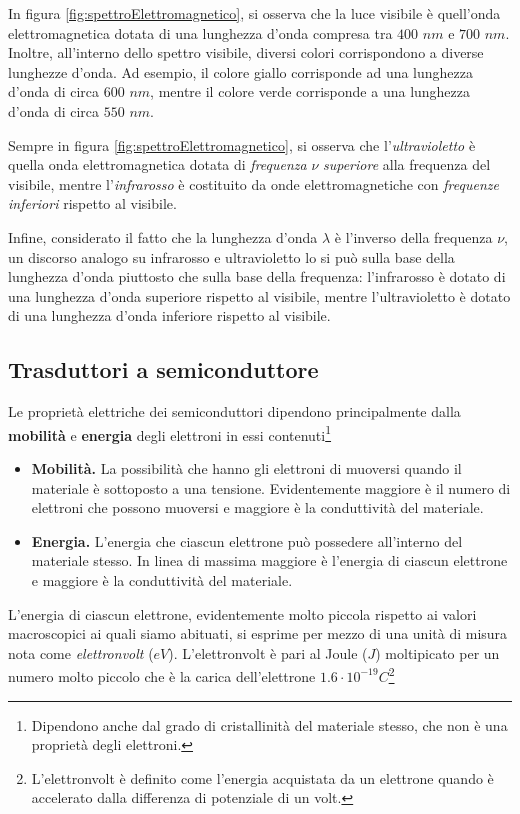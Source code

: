 \documentclass[17pt]{extarticle}
\begin{document}
In figura \ref{fig:spettroElettromagnetico}, si osserva che la luce visibile è quell'onda elettromagnetica dotata di una lunghezza d'onda compresa tra $400$ $nm$ e $700$ $nm$. Inoltre, all'interno dello spettro visibile, diversi colori corrispondono a diverse lunghezze d'onda. Ad esempio, il colore giallo corrisponde ad una lunghezza d'onda di circa $600$ $nm$, mentre il colore verde corrisponde a una lunghezza d'onda di circa $550$ $nm$. 

Sempre in figura \ref{fig:spettroElettromagnetico}, si osserva che l'\emph{ultravioletto} è quella onda elettromagnetica dotata di \emph{frequenza} $\nu$ \emph{superiore} alla frequenza del visibile, mentre l'\emph{infrarosso} è costituito da onde elettromagnetiche con \emph{frequenze} \emph{inferiori} rispetto al visibile. 

Infine, considerato il fatto che la lunghezza d'onda $\lambda$ è l'inverso della frequenza $\nu$, un discorso analogo su infrarosso e ultravioletto lo si può sulla base della lunghezza d'onda piuttosto che sulla base della frequenza: l'infrarosso è dotato di una lunghezza d'onda superiore rispetto al visibile, mentre l'ultravioletto è dotato di una lunghezza d'onda inferiore rispetto al visibile.


\subsection{Trasduttori a semiconduttore}\label{par:trasdSemicon}

Le proprietà elettriche dei semiconduttori dipendono principalmente dalla {\bf mobilità} e {\bf energia} degli elettroni in essi contenuti\footnote{Dipendono anche dal grado di cristallinità del materiale stesso, che non è una proprietà degli elettroni.}

\begin{itemize}
	\item {\bf Mobilità.} La possibilità che hanno gli elettroni di muoversi quando il materiale è sottoposto a una tensione. Evidentemente maggiore è il numero di elettroni che possono muoversi e maggiore è la conduttività del materiale.
	\item {\bf Energia.} L'energia che ciascun elettrone può possedere all'interno del materiale stesso. In linea di massima maggiore è l'energia di ciascun elettrone e maggiore è la conduttività del materiale. 	
\end{itemize}


	L'energia di ciascun elettrone, evidentemente molto piccola rispetto ai valori macroscopici ai quali siamo abituati, si esprime per mezzo di una unità di misura nota come \emph{elettronvolt} ($eV$). L'elettronvolt è pari al Joule ($J$) moltipicato per un numero molto piccolo che è la carica dell'elettrone $1.6\cdot 10^{-19}C$\footnote{L'elettronvolt è definito come l'energia acquistata da un elettrone quando è accelerato dalla differenza di potenziale di un volt.}
\end{document}
